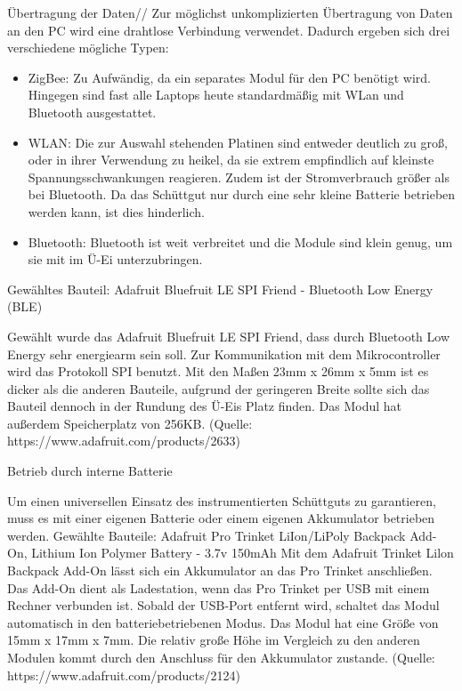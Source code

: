 {Übertragung der Daten//
Zur möglichst unkomplizierten Übertragung von Daten an den PC wird eine drahtlose Verbindung verwendet. Dadurch ergeben sich drei verschiedene mögliche Typen:
\begin{itemize}  %
	\item ZigBee: Zu Aufwändig, da ein separates Modul für den PC benötigt wird. Hingegen sind fast alle Laptops heute standardmäßig mit WLan und Bluetooth ausgestattet.
	\item WLAN: Die zur Auswahl stehenden Platinen sind entweder deutlich zu groß, oder in ihrer Verwendung zu heikel, da sie extrem empfindlich auf kleinste Spannungsschwankungen reagieren. Zudem ist der Stromverbrauch größer als bei Bluetooth. Da das Schüttgut nur durch eine sehr kleine Batterie betrieben werden kann, ist dies hinderlich.
	\item Bluetooth: Bluetooth ist weit verbreitet und die Module sind klein genug, um sie mit im Ü-Ei unterzubringen.
\end{itemize}

Gewähltes Bauteil: Adafruit Bluefruit LE SPI Friend - Bluetooth Low Energy (BLE)

Gewählt wurde das Adafruit Bluefruit LE SPI Friend, dass durch Bluetooth Low Energy sehr energiearm sein soll. Zur Kommunikation mit dem Mikrocontroller wird das Protokoll SPI benutzt. Mit den Maßen 23mm x 26mm x 5mm ist es dicker als die anderen Bauteile, aufgrund der geringeren Breite sollte sich das Bauteil dennoch in der Rundung des Ü-Eis Platz finden. Das Modul hat außerdem Speicherplatz von 256KB. (Quelle: https://www.adafruit.com/products/2633)

Betrieb durch interne Batterie

Um einen universellen Einsatz des instrumentierten Schüttguts zu garantieren, muss es mit einer eigenen Batterie oder einem eigenen Akkumulator betrieben werden. 
Gewählte Bauteile: Adafruit Pro Trinket LiIon/LiPoly Backpack Add-On, Lithium Ion Polymer Battery - 3.7v 150mAh
Mit dem Adafruit Trinket Lilon Backpack Add-On lässt sich ein Akkumulator an das Pro Trinket anschließen. Das Add-On dient als Ladestation, wenn das Pro Trinket per USB mit einem Rechner verbunden ist. Sobald der USB-Port entfernt wird, schaltet das Modul automatisch in den batteriebetriebenen Modus. Das Modul hat eine Größe von 15mm x 17mm x 7mm. Die relativ große Höhe im Vergleich zu den anderen Modulen kommt durch den Anschluss für den Akkumulator zustande. (Quelle: https://www.adafruit.com/products/2124)

}
